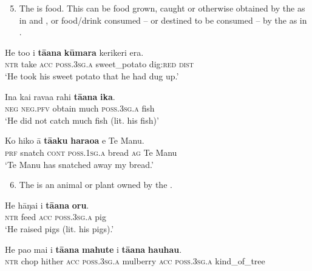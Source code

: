 \begin{enumerate}
\setcounter{enumi}{4}
\item 
The  is food. This can be food grown, caught or otherwise obtained by the  as in  and , or food/drink consumed – or destined to be consumed – by the  as in .

\end{enumerate}

\ea\label{ex:6.76}
\gll He to{\ꞌ}o i \textbf{tā{\ꞌ}ana} \textbf{kūmara} kerikeri era. \\
\textsc{ntr} take \textsc{acc} \textsc{poss.3sg.a} sweet\_potato dig:\textsc{red} \textsc{dist} \\

\glt 
‘He took his sweet potato that he had dug up.’ \textstyleExampleref{[Mtx-7-25.022]}
\z

\ea\label{ex:6.77}
\gll {\ꞌ}Ina kai rava{\ꞌ}a rahi \textbf{tā{\ꞌ}ana} \textbf{ika}. \\
\textsc{neg} \textsc{neg.pfv} obtain much \textsc{poss.3sg.a} fish \\

\glt
‘He did not catch much fish (lit. his fish)’ \textstyleExampleref{[R312.004]} 
\z


\ea\label{ex:6.78}
\gll Ko hiko {\ꞌ}ā \textbf{tā{\ꞌ}aku} \textbf{haraoa} e Te Manu. \\
\textsc{prf} snatch \textsc{cont} \textsc{poss.1sg.a} bread \textsc{ag} Te Manu \\

\glt
‘Te Manu has snatched away my bread.’ \textstyleExampleref{[R245.039]} 
\z

\begin{enumerate}
\setcounter{enumi}{5} 
\item 
The  is an animal or plant owned by the . 

\end{enumerate}

\ea\label{ex:6.79}
\gll He hāŋai i \textbf{tā{\ꞌ}ana} \textbf{oru}. \\
\textsc{ntr} feed \textsc{acc} \textsc{poss.3sg.a} pig \\

\glt 
‘He raised pigs (lit. his pigs).’ \textstyleExampleref{[R423.019]} 
\z

\ea\label{ex:6.80}
\gll He pa{\ꞌ}o mai i \textbf{tā{\ꞌ}ana} \textbf{mahute} i \textbf{tā{\ꞌ}ana} \textbf{hauhau}. \\
\textsc{ntr} chop hither \textsc{acc} \textsc{poss.3sg.a} mulberry \textsc{acc} \textsc{poss.3sg.a} kind\_of\_tree \\

